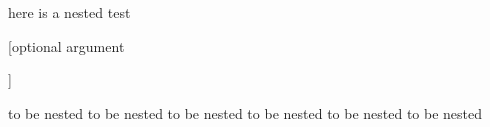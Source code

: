 here is a nested test
\begin{one}


	[optional argument

	]



	to be nested to be nested
	to be nested to be nested
	to be nested to be nested
\end{one}

